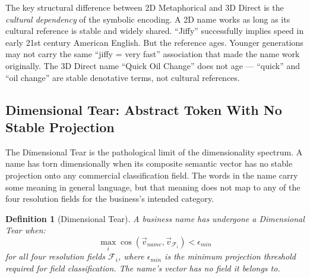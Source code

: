 \documentclass[12pt, openany]{book}
\theoremstyle{thmstyle}
\theoremstyle{defstyle}
\newtheorem{definition}{Definition}[chapter]
\begin{document}
The key structural difference between 2D Metaphorical and 3D Direct is the \textit{cultural dependency} of the symbolic encoding. A 2D name works as long as its cultural reference is stable and widely shared. ``Jiffy'' successfully implies speed in early 21st century American English. But the reference ages. Younger generations may not carry the same ``jiffy = very fast'' association that made the name work originally. The 3D Direct name ``Quick Oil Change'' does not age --- ``quick'' and ``oil change'' are stable denotative terms, not cultural references.

\subsection{Dimensional Tear: Abstract Token With No Stable Projection}

The Dimensional Tear is the pathological limit of the dimensionality spectrum. A name has torn dimensionally when its composite semantic vector has no stable projection onto any commercial classification field. The words in the name carry some meaning in general language, but that meaning does not map to any of the four resolution fields for the business's intended category.

\begin{definition}[Dimensional Tear]
A business name has undergone a Dimensional Tear when:
\begin{equation}
\max_i \cos(\vec{v}_{name}, \vec{v}_{\mathcal{F}_i}) < \epsilon_{min}
\label{eq:tear}
\end{equation}
for all four resolution fields $\mathcal{F}_i$, where $\epsilon_{min}$ is the minimum projection threshold required for field classification. The name's vector has no field it belongs to.
\end{definition}
\end{document}
